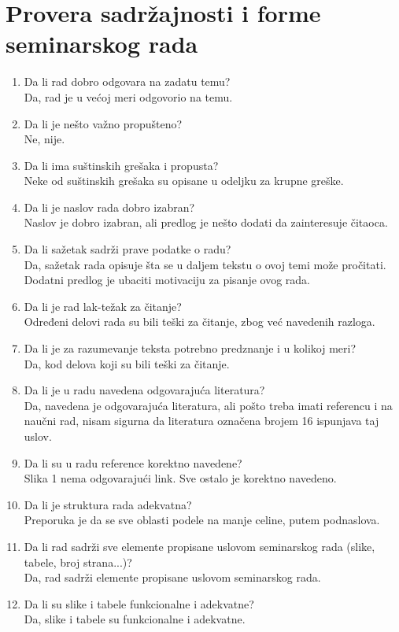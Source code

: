 \documentclass[a4paper]{report}
\begin{document}
\section{Provera sadržajnosti i forme seminarskog rada}

\begin{enumerate}
\item Da li rad dobro odgovara na zadatu temu?\\
Da, rad je u većoj meri odgovorio na temu.
\item Da li je nešto važno propušteno?\\
Ne, nije.
\item Da li ima suštinskih grešaka i propusta?\\
Neke od suštinskih grešaka su opisane u odeljku za krupne greške.
\item Da li je naslov rada dobro izabran?\\
Naslov je dobro izabran, ali predlog je nešto dodati da zainteresuje čitaoca.
\item Da li sažetak sadrži prave podatke o radu?\\
Da, sažetak rada opisuje šta se u daljem tekstu o ovoj temi može pročitati. Dodatni predlog je ubaciti motivaciju za pisanje ovog rada.
\item Da li je rad lak-težak za čitanje?\\
Određeni delovi rada su bili teški za čitanje, zbog već navedenih razloga.
\item Da li je za razumevanje teksta potrebno predznanje i u kolikoj meri?\\
Da, kod delova koji su bili teški za čitanje.
\item Da li je u radu navedena odgovarajuća literatura?\\
Da, navedena je odgovarajuća literatura, ali pošto treba imati referencu i na naučni rad, nisam sigurna da literatura označena brojem 16 ispunjava taj uslov.
\item Da li su u radu reference korektno navedene?\\
Slika 1 nema odgovarajući link. Sve ostalo je korektno navedeno.
\item Da li je struktura rada adekvatna?\\
Preporuka je da se sve oblasti podele na manje celine, putem podnaslova.
\item Da li rad sadrži sve elemente propisane uslovom seminarskog rada (slike, tabele, broj strana...)?\\Da, rad sadrži elemente propisane uslovom seminarskog rada.
\item Da li su slike i tabele funkcionalne i adekvatne?\\
Da, slike i tabele su funkcionalne i adekvatne.
\end{enumerate}
\end{document}
